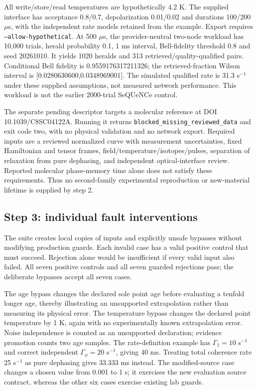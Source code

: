 \documentclass[10pt,a4paper]{article}
\newcommand{\code}[1]{\texttt{#1}}
\begin{document}
All write/store/read temperatures are hypothetically 4.2 K. The supplied interface has acceptance 0.8/0.7, depolarization 0.01/0.02 and durations 100/200 $\mu$s, with the independent rate models retained from the example. Export requires \code{--allow-hypothetical}. At 500 $\mu$s, the provider-neutral two-node workload has 10,000 trials, herald probability 0.1, 1 ms interval, Bell-fidelity threshold 0.8 and seed 20261010. It yields 1020 heralds and 313 retrieved/quality-qualified pairs. Conditional Bell fidelity is 0.9559176317211326; the retrieved-fraction Wilson interval is [0.0280630600,0.0348969001]. The simulated qualified rate is 31.3 s$^{-1}$ under these supplied assumptions, not measured network performance. This workload is not the earlier 2000-trial SeQUeNCe control.

The separate pending descriptor targets a molecular reference at DOI 10.1039/C8SC04122A. Running it returns \code{blocked\_missing\_reviewed\_data} and exit code two, with no physical validation and no network export. Required inputs are a reviewed normalized curve with measurement uncertainties, fixed Hamiltonian and tensor frames, field/temperature/isotopes/pulses, separation of relaxation from pure dephasing, and independent optical-interface review. Reported molecular phase-memory time alone does not satisfy these requirements. Thus no second-family experimental reproduction or new-material lifetime is supplied by step 2.

\subsection{Step 3: individual fault interventions}
The suite creates local copies of inputs and explicitly unsafe bypasses without modifying production guards. Each invalid case has a valid positive control that must succeed. Rejection alone would be insufficient if every valid input also failed. All seven positive controls and all seven guarded rejections pass; the deliberate bypasses accept all seven cases.


The age bypass changes the declared sole point age before evaluating a tenfold longer age, thereby illustrating an unsupported extrapolation rather than measuring its physical error. The temperature bypass changes the declared point temperature by 1 K, again with no experimentally known extrapolation error. Noise independence is counted as an unsupported declaration; evidence promotion counts two age samples. The rate-definition example has $\Gamma_1=10$ s$^{-1}$ and correct independent $\Gamma_\phi=20$ s$^{-1}$, giving 40 ms. Treating total coherence rate 25 s$^{-1}$ as pure dephasing gives 33.333 ms instead. The modified-source case changes a chosen value from 0.001 to 1 s; it exercises the new evaluation source contract, whereas the other six cases exercise existing lab guards.
\end{document}
